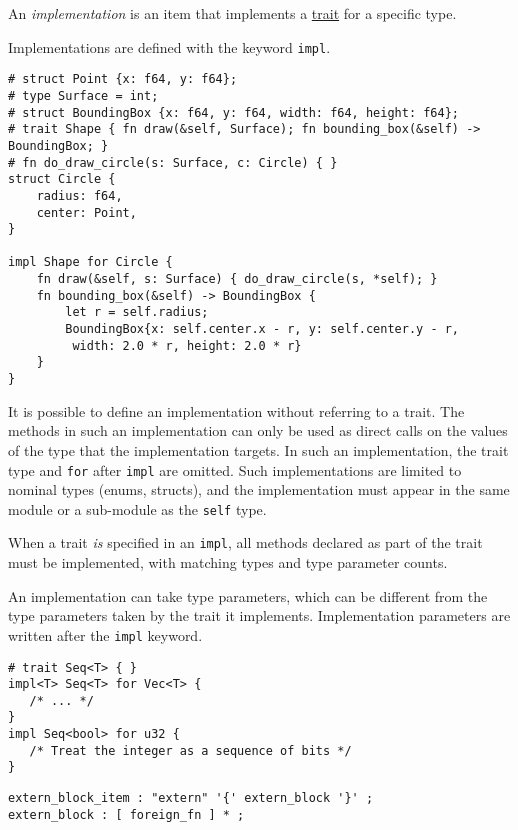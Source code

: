 \documentclass[]{article}
\begin{document}
An \emph{implementation} is an item that implements a
\hyperref[traits]{trait} for a specific type.

Implementations are defined with the keyword \texttt{impl}.

\begin{verbatim}
# struct Point {x: f64, y: f64};
# type Surface = int;
# struct BoundingBox {x: f64, y: f64, width: f64, height: f64};
# trait Shape { fn draw(&self, Surface); fn bounding_box(&self) -> BoundingBox; }
# fn do_draw_circle(s: Surface, c: Circle) { }
struct Circle {
    radius: f64,
    center: Point,
}

impl Shape for Circle {
    fn draw(&self, s: Surface) { do_draw_circle(s, *self); }
    fn bounding_box(&self) -> BoundingBox {
        let r = self.radius;
        BoundingBox{x: self.center.x - r, y: self.center.y - r,
         width: 2.0 * r, height: 2.0 * r}
    }
}
\end{verbatim}

It is possible to define an implementation without referring to a trait.
The methods in such an implementation can only be used as direct calls
on the values of the type that the implementation targets. In such an
implementation, the trait type and \texttt{for} after \texttt{impl} are
omitted. Such implementations are limited to nominal types (enums,
structs), and the implementation must appear in the same module or a
sub-module as the \texttt{self} type.

When a trait \emph{is} specified in an \texttt{impl}, all methods
declared as part of the trait must be implemented, with matching types
and type parameter counts.

An implementation can take type parameters, which can be different from
the type parameters taken by the trait it implements. Implementation
parameters are written after the \texttt{impl} keyword.

\begin{verbatim}
# trait Seq<T> { }
impl<T> Seq<T> for Vec<T> {
   /* ... */
}
impl Seq<bool> for u32 {
   /* Treat the integer as a sequence of bits */
}
\end{verbatim}


\begin{verbatim}
extern_block_item : "extern" '{' extern_block '}' ;
extern_block : [ foreign_fn ] * ;
\end{verbatim}
\end{document}
